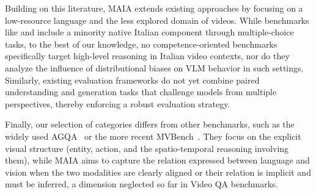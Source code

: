 Building on this literature, MAIA extends existing approaches by focusing on a low-resource language and the less explored domain of videos. While benchmarks like \citet{exams} and \citet{m3exam} include a minority native Italian component through multiple-choice tasks, to the best of our knowledge, no competence-oriented benchmarks specifically target high-level reasoning in Italian video contexts, nor do they analyze the influence of distributional biases on VLM behavior in such settings. Similarly, existing evaluation frameworks do not yet combine paired understanding and generation tasks that challenge models from multiple perspectives, thereby enforcing a robust evaluation strategy.


Finally, our selection of categories differs from other benchmarks, such as  the widely used AGQA~\cite{GrundeMcLaughlin2021AGQA} or the more recent MVBench~\cite{li:mvbench24}. They focus on the explicit visual structure (entity, action, and the spatio-temporal reasoning involving them), while MAIA  aims to capture the relation expressed  between language and vision when the two modalities are clearly aligned or their relation is implicit and must be inferred, a dimension neglected so far in Video QA benchmarks.  







